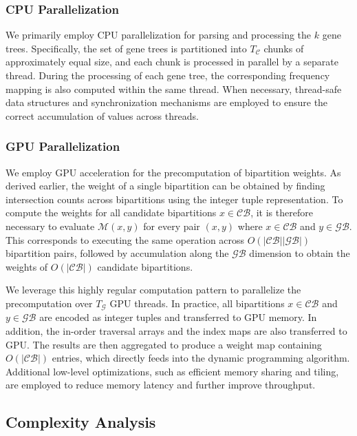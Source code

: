 \documentclass[10pt,a4paper]{article}
\begin{document}
\subsubsection{CPU Parallelization}

We primarily employ CPU parallelization for parsing and processing the $k$ gene trees. Specifically, the set of gene trees is partitioned into $T_\mathcal{C}$ chunks of approximately equal size, and each chunk is processed in parallel by a separate thread. During the processing of each gene tree, the corresponding frequency mapping is also computed within the same thread. When necessary, thread-safe data structures and synchronization mechanisms are employed to ensure the correct accumulation of values across threads.


\subsubsection{GPU Parallelization}

We employ GPU acceleration for the precomputation of bipartition weights. As derived earlier, the weight of a single bipartition can be obtained by finding intersection counts across bipartitions using the integer tuple representation. To compute the weights for all candidate bipartitions $x \in \mathcal{CB}$, it is therefore necessary to evaluate $\mathcal{M}(x,y)$ for every pair $(x,y)$ where $x \in \mathcal{CB}$ and $y \in \mathcal{GB}$. This corresponds to executing the same operation across $O(|\mathcal{CB}||\mathcal{GB}|)$ bipartition pairs, followed by accumulation along the $\mathcal{GB}$ dimension to obtain the weights of $O(|\mathcal{CB}|)$ candidate bipartitions.  

We leverage this highly regular computation pattern to parallelize the precomputation over $T_\mathcal{G}$ GPU threads. In practice, all bipartitions $x \in \mathcal{CB}$ and $y \in \mathcal{GB}$ are encoded as integer tuples and transferred to GPU memory. In addition, the in-order traversal arrays and the index maps are also transferred to GPU. The results are then aggregated to produce a weight map containing $O(|\mathcal{CB}|)$ entries, which directly feeds into the dynamic programming algorithm. Additional low-level optimizations, such as efficient memory sharing and tiling, are employed to reduce memory latency and further improve throughput.


\subsection{Complexity Analysis}
\label{subsec:complexity}
\end{document}
